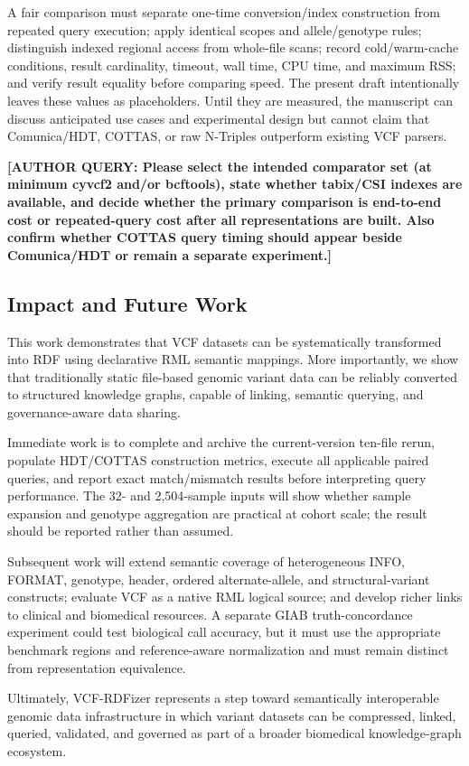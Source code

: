 \documentclass[pdflatex,sn-mathphys-num]{sn-jnl}%
\newenvironment{revision}{\begingroup\color{revisionblue}}{\endgroup}%
\newcommand{\authorquery}[1]{%
  \par\smallskip\noindent
  {\color{queryorange}\textbf{[AUTHOR QUERY: #1]}}%
  \par\smallskip
}%
\theoremstyle{thmstyleone}%
\theoremstyle{thmstyletwo}%
\theoremstyle{thmstylethree}%
\begin{document}
\begin{revision}
A fair comparison must separate one-time conversion/index construction from repeated query execution; apply identical scopes and allele/genotype rules; distinguish indexed regional access from whole-file scans; record cold/warm-cache conditions, result cardinality, timeout, wall time, CPU time, and maximum RSS; and verify result equality before comparing speed. The present draft intentionally leaves these values as placeholders. Until they are measured, the manuscript can discuss anticipated use cases and experimental design but cannot claim that Comunica/HDT, COTTAS, or raw N-Triples outperform existing VCF parsers.
\end{revision}
\authorquery{Please select the intended comparator set (at minimum cyvcf2 and/or bcftools), state whether tabix/CSI indexes are available, and decide whether the primary comparison is end-to-end cost or repeated-query cost after all representations are built. Also confirm whether COTTAS query timing should appear beside Comunica/HDT or remain a separate experiment.}

\subsection{Impact and Future Work}\label{subsec4.3}
This work demonstrates that VCF datasets can be systematically transformed into RDF using declarative RML semantic mappings. 
More importantly, we show that traditionally static file-based genomic variant data can be reliably converted to structured knowledge graphs, capable of linking, semantic querying, and governance-aware data sharing.

\begin{revision}
Immediate work is to complete and archive the current-version ten-file rerun, populate HDT/COTTAS construction metrics, execute all applicable paired queries, and report exact match/mismatch results before interpreting query performance. The 32- and 2,504-sample inputs will show whether sample expansion and genotype aggregation are practical at cohort scale; the result should be reported rather than assumed.

Subsequent work will extend semantic coverage of heterogeneous INFO, FORMAT, genotype, header, ordered alternate-allele, and structural-variant constructs; evaluate VCF as a native RML logical source; and develop richer links to clinical and biomedical resources. A separate GIAB truth-concordance experiment could test biological call accuracy, but it must use the appropriate benchmark regions and reference-aware normalization and must remain distinct from representation equivalence.

Ultimately, VCF-RDFizer represents a step toward semantically interoperable genomic data infrastructure in which variant datasets can be compressed, linked, queried, validated, and governed as part of a broader biomedical knowledge-graph ecosystem.
\end{revision}
\end{document}
